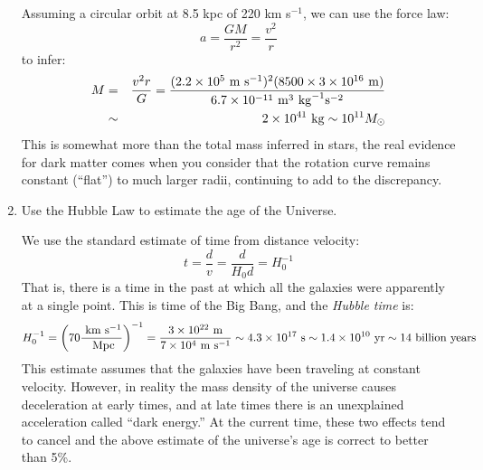 \begin{enumerate}
\begin{answer}
  Assuming a circular orbit at 8.5 kpc of 220 km s$^{-1}$, we can use
  the force law:
  \begin{equation}
   a = \frac{GM}{r^2} = \frac{v^2}{r}
  \end{equation}
  to infer:
  \begin{eqnarray}
   M &=& \frac{v^2 r}{G} =  \frac{(2.2 \times 10^5 {\rm ~m} {\rm
       ~s}^{-1})^2 (8500 \times 3 \times 10^{16} {\rm ~m})}
   {6.7 \times 10^{-11} {\rm ~m}^3 {\rm ~kg}^{-1} {\rm s}^{-2}} \cr
   &\sim& 2\times 10^{41} {\rm ~kg} \sim 10^{11} M_\odot 
  \end{eqnarray}
  This is somewhat more than the total mass inferred in stars, the
  real evidence for  dark matter comes when you consider that the
  rotation curve remains constant (``flat'') to much larger radii,
  continuing to add to the discrepancy.
\end{answer}
\item Use the Hubble Law to estimate the age of the Universe.

  \begin{answer}
    We use the standard estimate of time from distance velocity:
    \begin{equation}
      t = \frac{d}{v} = \frac{d}{H_0 d} = H_0^{-1}
    \end{equation}
    That is, there is a time in the past at which all the galaxies
    were apparently at a single point. This is time of the Big Bang,
    and the {\it Hubble time} is:
    \begin{equation}
      H_0^{-1} = \left(70 \frac{{\rm ~km} {\rm ~s}^{-1}}{{\rm
          ~Mpc}}\right)^{-1} =  \frac{3 \times 10^{22} {\rm ~m}}{7
        \times 10^4 {\rm ~m} {\rm ~s}^{-1}} \sim 4.3 \times 10^{17}
      {\rm ~s} \sim 1.4 \times 10^{10} {\rm ~yr} \sim 14 {\rm
        ~billion~years}
    \end{equation}
    This estimate assumes that the galaxies have been traveling at
    constant velocity. However, in reality the mass density of the
    universe causes deceleration at early times, and at late times
    there is an unexplained acceleration called ``dark energy.'' At
    the current time, these two effects tend to cancel and the above
    estimate of the universe's age is correct to better than 5\%.
  \end{answer}
\end{enumerate}   


  
